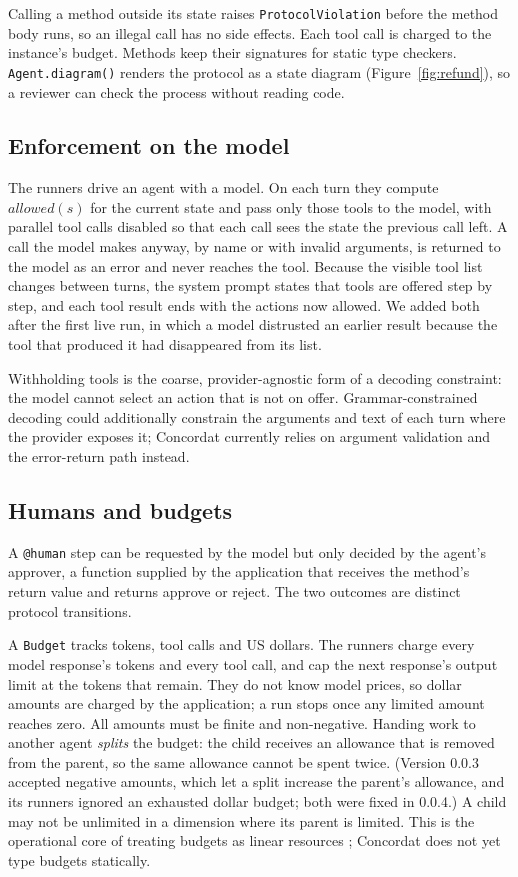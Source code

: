 \documentclass[11pt]{article}
\begin{document}
Calling a method outside its state raises \texttt{ProtocolViolation} before the method
body runs, so an illegal call has no side effects. Each tool call is charged to the
instance's budget. Methods keep their signatures for static type checkers.
\texttt{Agent.diagram()} renders the protocol as a state diagram (Figure~\ref{fig:refund}),
so a reviewer can check the process without reading code.

\subsection{Enforcement on the model}

The runners drive an agent with a model. On each turn they compute
$\mathit{allowed}(s)$ for the current state and pass only those tools to the model, with
parallel tool calls disabled so that each call sees the state the previous call left.
A call the model makes anyway, by name or with invalid arguments, is returned to the
model as an error and never reaches the tool. Because the visible tool list changes
between turns, the system prompt states that tools are offered step by step, and each
tool result ends with the actions now allowed. We added both after the first live run,
in which a model distrusted an earlier result because the tool that produced it had
disappeared from its list.

Withholding tools is the coarse, provider-agnostic form of a decoding constraint: the
model cannot select an action that is not on offer. Grammar-constrained decoding
\citep{willard2023outlines,dong2024xgrammar} could additionally constrain the arguments
and text of each turn where the provider exposes it; Concordat currently relies on
argument validation and the error-return path instead.

\subsection{Humans and budgets}

A \texttt{@human} step can be requested by the model but only decided by the agent's
approver, a function supplied by the application that receives the method's return
value and returns approve or reject. The two outcomes are distinct protocol transitions.

A \texttt{Budget} tracks tokens, tool calls and US dollars. The runners charge every
model response's tokens and every tool call, and cap the next response's output limit at
the tokens that remain. They do not know model prices, so dollar amounts are charged by
the application; a run stops once any limited amount reaches zero. All amounts must be
finite and non-negative. Handing work to another agent \emph{splits} the budget: the
child receives an allowance that is removed from the parent, so the same allowance
cannot be spent twice. (Version 0.0.3 accepted negative amounts, which let a split
increase the parent's allowance, and its runners ignored an exhausted dollar budget;
both were fixed in 0.0.4.) A child may not be
unlimited in a dimension where its parent is limited. This is the operational core of
treating budgets as linear resources \citep{das2018resource}; Concordat does not yet
type budgets statically.
\end{document}
